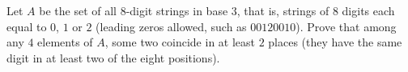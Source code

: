 Let $A$ be the set of all $8$-digit strings in base $3$, that is, strings of $8$ digits each equal to $0$, $1$ or $2$ (leading zeros allowed, such as $00120010$). Prove that among any $4$ elements of $A$, some two coincide in at least $2$ places (they have the same digit in at least two of the eight positions).
